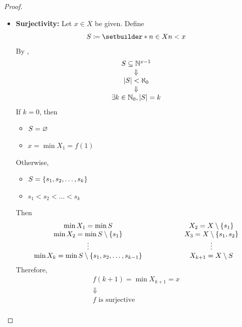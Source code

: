 \begin{proof}
\begin{itemize}
\begin{itemize}
            \item $f(n_{1}) = \min X_{n_{1}} \in X_{n_{1}}$
            \item $f(n_{2}) = \min X_{n_{2}} \in X_{n_{2}}$
        \end{itemize}
        Then
        \[
        \begin{array}{c}
            X_{n_{2}} \subseteq X_{n_{1}} \setminus \set*{f(n_{1})} \\
            \Downarrow \\
            f(n_{2}) \neq f(n_{1}) \\
            \Downarrow \\
            f \text{ is injective}
        \end{array}
        \]
        \item \textbf{Surjectivity:} Let $x \in X$ be given. Define
        \[
        S \coloneqq \setbuilder*{n \in X}{n < x}
        \]
        By ,
        \[
        \begin{array}{c}
            S \subseteq \N^{x - 1} \\
            \Downarrow \\
            \abs*{S} < \aleph_{0} \\
            \Downarrow \\
            \exists k \in \N_{0}, \abs*{S} = k
        \end{array}
        \]
        If $k = 0$, then
        \begin{itemize}
            \item $S = \vnot$
            \item $x = \min X_{1} = f(1)$
        \end{itemize}
        Otherwise,
        \begin{itemize}
            \item $S = \set*{s_{1}, s_{2}, \dots, s_{k}}$
            \item $s_{1} < s_{2} < \dots < s_{k}$
        \end{itemize}
        Then
        \[
        \begin{array}{c@{\qquad\qquad\qquad}c}
            \min X_{1} = \min S & X_{2} = X \setminus \set*{s_{1}} \\
            \min X_{2} = \min S \setminus \set*{s_{1}} & X_{3} = X \setminus \set*{s_{1}, s_{2}} \\
            \vdots & \vdots \\
            \min X_{k} = \min S \setminus \set*{s_{1}, s_{2}, \dots, s_{k - 1}} & X_{k + 1} = X \setminus S
        \end{array}
        \]
        Therefore,
        \[
        \begin{array}{c}
            f(k + 1) = \min X_{k + 1} = x \\
            \Downarrow \\
            f \text{ is surjective} \\
        \end{array}
        \]
    \end{itemize}
\end{proof}

